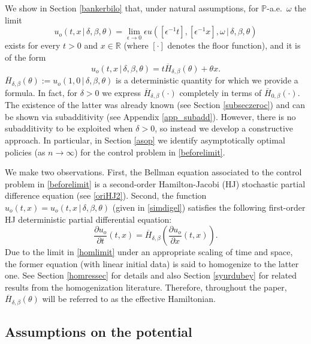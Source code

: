 \documentclass[a4paper]{amsart}
\numberwithin{equation}{section}
\theoremstyle{plain}
\theoremstyle{remark}
\begin{document}
We show in Section \ref{bankerbilo} that, under natural assumptions, for $\mathbb{P}$-a.e.\ $\omega$ the limit
\begin{equation}\label{homlimit}
u_o(t,x\,|\,\delta,\beta,\theta) = \lim_{{\epsilon}\to0}{\epsilon} u\left([{\epsilon}^{-1}t],[{\epsilon}^{-1}x],\omega\,|\,\delta,\beta,\theta\right)
\end{equation}
exists for every $t > 0$ and $x\in\mathbb{R}$ (where $[\cdot]$ denotes the floor function), and it is of the form
\begin{equation}\label{simdigel}
u_o(t,x\,|\,\delta,\beta,\theta) = t\overline H_{\delta,\beta}(\theta) + \theta x.
\end{equation}
$\overline H_{\delta,\beta}(\theta) := u_o(1,0\,|\,\delta,\beta,\theta)$ is a deterministic quantity for which
we provide a formula. In fact, for $\delta>0$ we express $\overline H_{\delta,\beta}(\cdot)$ completely in terms of $\overline H_{0,\beta}(\cdot)$. The existence of the latter was already known (see Section \ref{subseczeroc}) and can be shown via subadditivity (see Appendix \ref{app_subadd}). However, there is no subadditivity to be exploited when $\delta>0$, so instead we develop a constructive approach. In particular, in Section \ref{asop} we identify asymptotically optimal policies (as $n\to\infty$) for the control problem in \eqref{beforelimit}.

We make two observations. First, the Bellman equation associated to the control problem in \eqref{beforelimit} is a second-order Hamilton-Jacobi (HJ) stochastic partial difference equation (see \eqref{oriHJ2}). Second, the function $u_o(t,x) = u_o(t,x\,|\,\delta,\beta,\theta)$ (given in \eqref{simdigel}) satisfies the following first-order HJ deterministic partial differential equation:
$$\frac{\partial u_o}{\partial t}(t,x) = \overline H_{\delta,\beta}\left(\frac{\partial u_o}{\partial x}(t,x)\right).$$
Due to the limit in \eqref{homlimit} under an appropriate scaling of time and space, the former equation (with linear initial data) is said to homogenize to the latter one. See Section \ref{homressec} for details and also Section \ref{syurdubey} for related results from the homogenization literature. Therefore, throughout the paper, $\overline H_{\delta,\beta}(\theta)$ will be referred to as the effective Hamiltonian.

\subsection{Assumptions on the potential}\label{subsecass}
\end{document}
